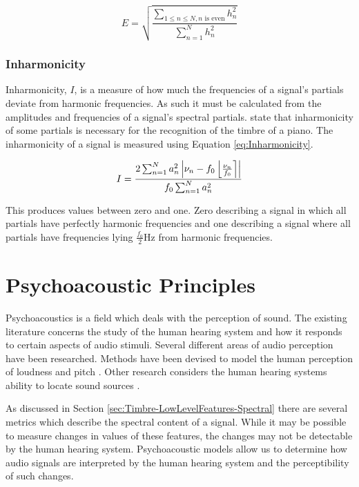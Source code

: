 			\begin{equation}
				E = \sqrt{\frac{\sum_{1 \leq n \leq N, n \text{ is even}} h_{n}^{2}}
					       {\sum_{n = 1}^{N} h_{n}^{2}}}
				\label{eq:Evenness}
			\end{equation}

		\subsubsection*{Inharmonicity}
			Inharmonicity, $I$, is a measure of how much the frequencies of a signal's partials deviate from
			harmonic frequencies. As such it must be calculated from the amplitudes and frequencies of a
			signal's spectral partials. \citet{fletcher1962quality} state that inharmonicity of some partials
			is necessary for the recognition of the timbre of a piano. The inharmonicity of a signal is
			measured using Equation \ref{eq:Inharmonicity}.
			
			\begin{equation}
				I = \frac{2\sum_{n = 1}^{N}a_{n}^{2}
					   \left|\nu_{n} - f_{0}\left\lfloor\frac{\nu_{n}}{f_{0}}\right\rceil\right|}
					   {f_{0}\sum_{n = 1}^{N} a_{n}^{2}}
				\label{eq:Inharmonicity}
			\end{equation}

			This produces values between zero and one. Zero describing a signal in which all partials have
			perfectly harmonic frequencies and one describing a signal where all partials have frequencies
			lying $\frac{f_{0}}{2}$Hz from harmonic frequencies.

\section{Psychoacoustic Principles}
\label{sec:Timbre-PsychoacousticPrinciples}
	Psychoacoustics is a field which deals with the perception of sound. The existing literature concerns the study of
	the human hearing system and how it responds to certain aspects of audio stimuli. Several different areas of audio
	perception have been researched. Methods have been devised to model the human perception of loudness
	\citep{moore1997a} and pitch \citep{gerhard2003pitch}. Other research considers the human hearing systems ability
	to locate sound sources \citep{blauert1997spatial}. 

	As discussed in Section \ref{sec:Timbre-LowLevelFeatures-Spectral} there are several metrics which describe the
	spectral content of a signal. While it may be possible to measure changes in values of these features, the changes
	may not be detectable by the human hearing system. Psychoacoustic models allow us to determine how audio signals
	are interpreted by the human hearing system and the perceptibility of such changes.


